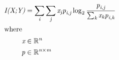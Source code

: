 \documentclass[12pt]{article}
\begin{document}
\begin{center}
\resizebox{\textwidth}{!} 
{
\begin{minipage}[c]{\textwidth}
\begin{align*}
\textit{I(X;Y)} & = \sum_\textit{i} \sum_\textit{j} \textit{x}_{ \textit{j} }\textit{p}_{\textit{i}, \textit{j}} \log_2{ \frac{\textit{p}_{\textit{i}, \textit{j}}}{\sum_\textit{k} \textit{x}_{ \textit{k} }\textit{p}_{\textit{i}, \textit{k}}} } \\
\intertext{where} 
\textit{x} & \in \mathbb{R}^{ \textit{n}} \\
\textit{p} & \in \mathbb{R}^{ \textit{n} \times \textit{m} } \\
\\
\end{align*}
\end{minipage}
}
\end{center}
\end{document}

